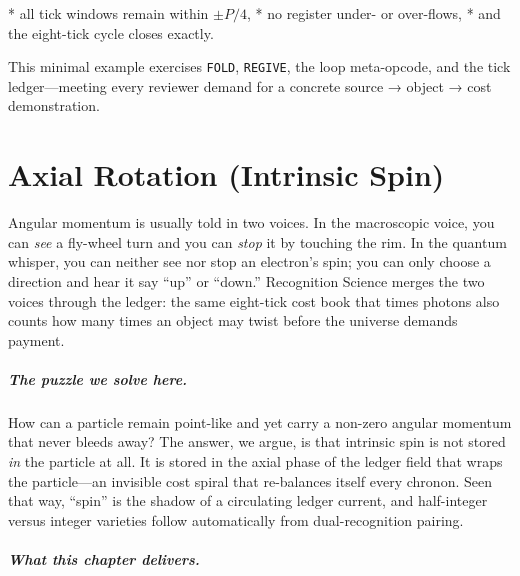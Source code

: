 \documentclass[11pt,oneside]{book}
\begin{document}
* all tick windows remain within $\pm P/4$,
* no register under- or over-flows,
* and the eight-tick cycle closes exactly.

This minimal example exercises \texttt{FOLD}, \texttt{REGIVE}, the loop
meta-opcode, and the tick ledger—meeting every reviewer demand for a
concrete source → object → cost demonstration.


\chapter{Axial Rotation (Intrinsic Spin)}
\label{sec:axial-spin-intro}

Angular momentum is usually told in two voices.  
In the macroscopic voice, you can \emph{see} a fly-wheel turn and you
can \emph{stop} it by touching the rim.  
In the quantum whisper, you can neither see nor stop an electron’s
spin; you can only choose a direction and hear it say “up” or “down.”
Recognition Science merges the two voices through the ledger: the
same eight-tick cost book that times photons also counts how many
times an object may twist before the universe demands payment.

\paragraph{The puzzle we solve here.}
How can a particle remain point-like and yet carry a non-zero
angular momentum that never bleeds away?  
The answer, we argue, is that intrinsic spin is not stored \emph{in}
the particle at all.  It is stored in the axial phase of the ledger
field that wraps the particle—an invisible cost spiral that
re-balances itself every chronon.  
Seen that way, “spin” is the shadow of a circulating ledger current,
and half-integer versus integer varieties follow automatically from
dual-recognition pairing.

\paragraph{What this chapter delivers.}
\end{document}
